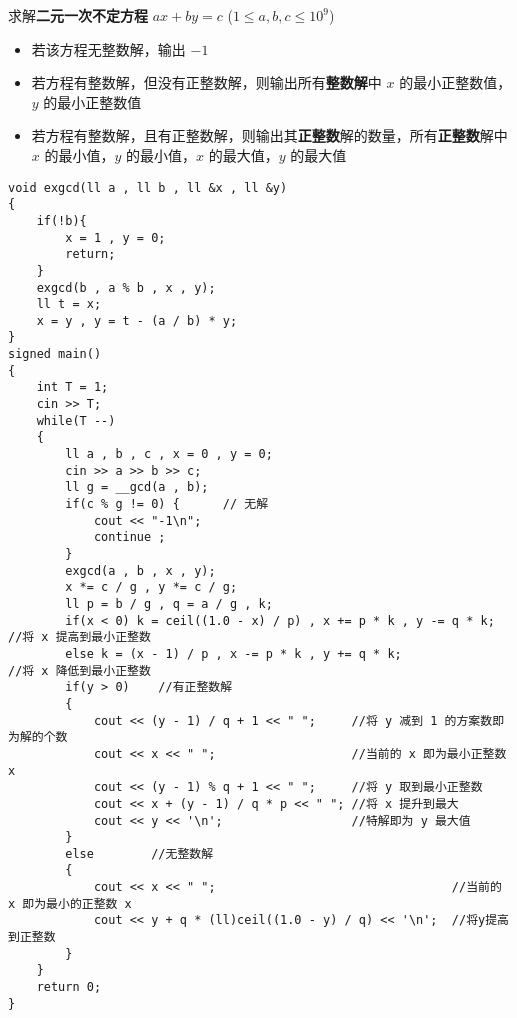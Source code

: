 \documentclass[E:/GsjzTle/main/main.tex]{subfiles}
\begin{document}
求解\textbf{二元一次不定方程} \(ax+by=c\) (\(1 \le a, b, c \le {10}^9\))

\begin{itemize}
\item
  若该方程无整数解，输出 \(-1\)
\item
  若方程有整数解，但没有正整数解，则输出所有\textbf{整数解}中 \(x\)
  的最小正整数值，\(y\) 的最小正整数值
\item
  若方程有整数解，且有正整数解，则输出其\textbf{正整数}解的数量，所有\textbf{正整数}解中
  \(x\) 的最小值，\(y\) 的最小值，\(x\) 的最大值，\(y\) 的最大值
\end{itemize}

\begin{lstlisting}
void exgcd(ll a , ll b , ll &x , ll &y)
{
	if(!b){
		x = 1 , y = 0;
		return;
	}
	exgcd(b , a % b , x , y);
	ll t = x;
	x = y , y = t - (a / b) * y;
}
signed main()
{
	int T = 1;
	cin >> T;
	while(T --)
	{
		ll a , b , c , x = 0 , y = 0;
		cin >> a >> b >> c;
		ll g = __gcd(a , b);
		if(c % g != 0) {      // 无解
			cout << "-1\n";
			continue ;
		}
		exgcd(a , b , x , y);
		x *= c / g , y *= c / g;
		ll p = b / g , q = a / g , k;
		if(x < 0) k = ceil((1.0 - x) / p) , x += p * k , y -= q * k;  //将 x 提高到最小正整数
		else k = (x - 1) / p , x -= p * k , y += q * k;				  //将 x 降低到最小正整数
		if(y > 0) 	 //有正整数解
		{
			cout << (y - 1) / q + 1 << " ";  	//将 y 减到 1 的方案数即为解的个数
			cout << x << " ";					//当前的 x 即为最小正整数 x
			cout << (y - 1) % q + 1 << " "; 	//将 y 取到最小正整数
			cout << x + (y - 1) / q * p << " ";	//将 x 提升到最大
			cout << y << '\n';					//特解即为 y 最大值
		}
		else 		//无整数解
		{
			cout << x << " ";								  //当前的 x 即为最小的正整数 x 
			cout << y + q * (ll)ceil((1.0 - y) / q) << '\n';  //将y提高到正整数
		}
	}
	return 0;
}
\end{lstlisting}
\end{document}
